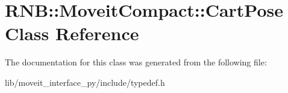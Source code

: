 \hypertarget{class_r_n_b_1_1_moveit_compact_1_1_cart_pose}{}\section{R\+NB\+:\+:Moveit\+Compact\+:\+:Cart\+Pose Class Reference}
\label{class_r_n_b_1_1_moveit_compact_1_1_cart_pose}


The documentation for this class was generated from the following file\+:\begin{DoxyCompactItemize}
\item 
lib/moveit\+\_\+interface\+\_\+py/include/typedef.\+h\end{DoxyCompactItemize}
